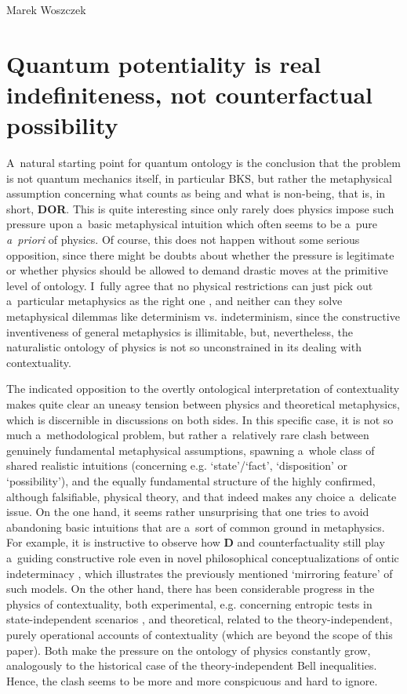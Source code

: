 \begin{artengenv}{Marek Woszczek}
\section{Quantum potentiality is real indefiniteness, not counterfactual possibility}
A~natural starting point for quantum ontology is the conclusion that the problem is not quantum mechanics itself, in particular BKS, but rather the metaphysical assumption concerning what counts as being and what is non-being, that is, in short, \textbf{DOR}. This is quite interesting since only rarely does physics impose such pressure upon a~basic metaphysical intuition which often seems to be a~pure \textit{a~priori} of physics. Of course, this does not happen without some serious opposition, since there might be doubts about whether the pressure is legitimate or whether physics should be allowed to demand drastic moves at the primitive level of ontology. I~fully agree that no physical restrictions can just pick out a~particular metaphysics as the right one
\parencites[cf. e.g.][]{hawley_science_2006}[][]{hawley_science_2006}, %
 and neither can they solve metaphysical dilemmas like determinism vs. indeterminism, since the constructive inventiveness of general metaphysics is illimitable, but, nevertheless, the naturalistic ontology of physics is not so unconstrained in its dealing with contextuality.

The indicated opposition to the overtly ontological interpretation of contextuality makes quite clear an uneasy tension between physics and theoretical metaphysics, which is discernible in discussions on both sides. In this specific case, it is not so much a~methodological problem, but rather a~relatively rare clash between genuinely fundamental metaphysical assumptions, spawning a~whole class of shared realistic intuitions (concerning e.g. ‘state'/‘fact', ‘disposition' or ‘possibility'), and the equally fundamental structure of the highly confirmed, although falsifiable, physical theory, and that indeed makes any choice a~delicate issue. On the one hand, it seems rather unsurprising that one tries to avoid abandoning basic intuitions that are a~sort of common ground in metaphysics. For example, it is instructive to observe how \textbf{D} and counterfactuality still play a~guiding constructive role even in novel philosophical conceptualizations of ontic indeterminacy
\parencite[e.g.][]{akiba_vagueness_2004}, %
 which illustrates the previously mentioned ‘mirroring feature' of such models. On the other hand, there has been considerable progress in the physics of contextuality, both experimental, e.g. concerning entropic tests in state-independent scenarios 
\parencite[][]{qu_experimental_2020}, %
 and theoretical, related to the theory-independent, purely operational accounts of contextuality (which are beyond the scope of this paper). Both make the pressure on the ontology of physics constantly grow, analogously to the historical case of the theory-independent Bell inequalities. Hence, the clash seems to be more and more conspicuous and hard to ignore.


\end{artengenv}
